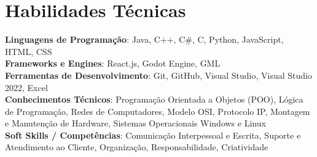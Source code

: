 \documentclass[a4paper,11pt]{article}
\begin{document}
\section{\textbf{Habilidades Técnicas}}
 \begin{itemize}[leftmargin=0.05in, label={}]
    \small{\item{
     \textbf{Linguagens de Programação}{: Java, C++, C\#, C, Python, JavaScript, HTML, CSS} \\ [1.5pt]
     \textbf{Frameworks e Engines}{: React.js, Godot Engine, GML} \\ [1.5pt]
     \textbf{Ferramentas de Desenvolvimento}{: Git, GitHub, Visual Studio, Visual Studio 2022, Excel} \\ [1.5pt]
     \textbf{Conhecimentos Técnicos}{: Programação Orientada a Objetos (POO), Lógica de Programação, Redes de Computadores, Modelo OSI, Protocolo IP, Montagem e Manutenção de Hardware, Sistemas Operacionais Windows e Linux} \\ [1.5pt]
     \textbf{Soft Skills / Competências}{: Comunicação Interpessoal e Escrita, Suporte e Atendimento ao Cliente, Organização, Responsabilidade, Criatividade}
    }}
 \end{itemize}
 \vspace{-16pt}
\end{document}

